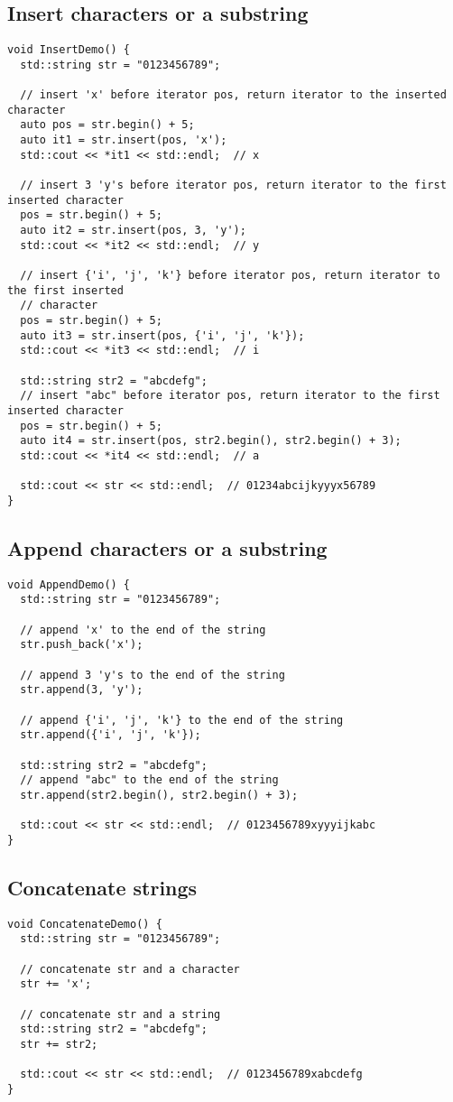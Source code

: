 \subsection{Insert characters or a substring}
\begin{lstlisting}
void InsertDemo() {
  std::string str = "0123456789";

  // insert 'x' before iterator pos, return iterator to the inserted character
  auto pos = str.begin() + 5;
  auto it1 = str.insert(pos, 'x');
  std::cout << *it1 << std::endl;  // x

  // insert 3 'y's before iterator pos, return iterator to the first inserted character
  pos = str.begin() + 5;
  auto it2 = str.insert(pos, 3, 'y');
  std::cout << *it2 << std::endl;  // y

  // insert {'i', 'j', 'k'} before iterator pos, return iterator to the first inserted
  // character
  pos = str.begin() + 5;
  auto it3 = str.insert(pos, {'i', 'j', 'k'});
  std::cout << *it3 << std::endl;  // i

  std::string str2 = "abcdefg";
  // insert "abc" before iterator pos, return iterator to the first inserted character
  pos = str.begin() + 5;
  auto it4 = str.insert(pos, str2.begin(), str2.begin() + 3);
  std::cout << *it4 << std::endl;  // a

  std::cout << str << std::endl;  // 01234abcijkyyyx56789
}
\end{lstlisting}

\subsection{Append characters or a substring}
\begin{lstlisting}
void AppendDemo() {
  std::string str = "0123456789";

  // append 'x' to the end of the string
  str.push_back('x');

  // append 3 'y's to the end of the string
  str.append(3, 'y');

  // append {'i', 'j', 'k'} to the end of the string
  str.append({'i', 'j', 'k'});

  std::string str2 = "abcdefg";
  // append "abc" to the end of the string
  str.append(str2.begin(), str2.begin() + 3);

  std::cout << str << std::endl;  // 0123456789xyyyijkabc
}
\end{lstlisting}

\subsection{Concatenate strings}
\begin{lstlisting}
void ConcatenateDemo() {
  std::string str = "0123456789";

  // concatenate str and a character
  str += 'x';

  // concatenate str and a string
  std::string str2 = "abcdefg";
  str += str2;

  std::cout << str << std::endl;  // 0123456789xabcdefg
}
\end{lstlisting}

